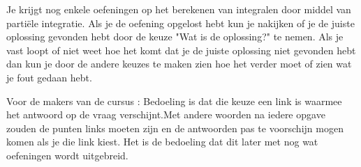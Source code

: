 \documentclass{article}
\begin{document}
Je krijgt nog enkele oefeningen op het berekenen van integralen door middel van parti\"ele integratie.
Als je de oefening opgelost hebt kun je nakijken of je de juiste oplossing gevonden hebt door de keuze "Wat is de oplossing?" te nemen.
Als je vast loopt of niet weet hoe het komt dat je de juiste oplossing niet gevonden hebt dan kun je door de andere keuzes te maken zien hoe het verder moet of zien wat je fout gedaan hebt. 

\vspace {3mm}

Voor de makers van de cursus : Bedoeling is dat die keuze een link is waarmee het antwoord op de vraag verschijnt.Met andere woorden na iedere opgave zouden de punten links moeten zijn en de antwoorden pas te voorschijn mogen komen als je die link kiest.
Het is de bedoeling dat dit later met nog wat oefeningen wordt uitgebreid.

\vspace{2mm}
\end{document}
